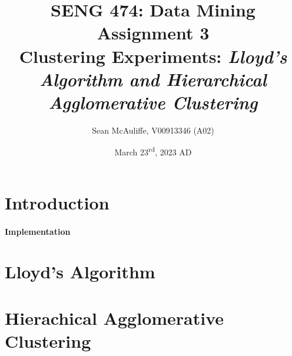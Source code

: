 \documentclass[letterpaper]{article}
\title{\textbf{SENG 474: Data Mining \\Assignment 3} \\[2ex]
\large Clustering Experiments: 
\large \textit{Lloyd's Algorithm and Hierarchical Agglomerative Clustering}}
\author{Sean McAuliffe, V00913346 (A02)}
\date{March 23\textsuperscript{rd}, 2023 AD}
\begin{document}
\maketitle

\pagebreak
\tableofcontents  
\pagebreak

\section{Introduction}

\paragraph{Implementation}

\section{Lloyd's Algorithm}

\section{Hierachical Agglomerative Clustering}
\end{document}
